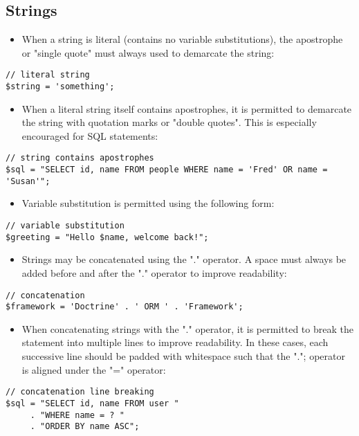 \documentclass[11pt,a4paper]{report}
\begin{document}
\subsection{Strings}
\begin{itemize}
\item{When a string is literal (contains no variable substitutions), the apostrophe or "single quote" must always used to demarcate the string:}
\end{itemize}
\begin{verbatim}
// literal string
$string = 'something';
\end{verbatim}

\begin{itemize}
\item{When a literal string itself contains apostrophes, it is permitted to demarcate the string with quotation marks or "double quotes". This is especially encouraged for SQL statements:}
\end{itemize}
\begin{verbatim}
// string contains apostrophes
$sql = "SELECT id, name FROM people WHERE name = 'Fred' OR name = 'Susan'";
\end{verbatim}

\begin{itemize}
\item{Variable substitution is permitted using the following form:}
\end{itemize}
\begin{verbatim}
// variable substitution
$greeting = "Hello $name, welcome back!";
\end{verbatim}

\begin{itemize}
\item{Strings may be concatenated using the "." operator. A space must always be added before and after the "." operator to improve readability:}
\end{itemize}
\begin{verbatim}
// concatenation
$framework = 'Doctrine' . ' ORM ' . 'Framework';
\end{verbatim}

\begin{itemize}
\item{When concatenating strings with the "." operator, it is permitted to break the statement into multiple lines to improve readability. In these cases, each successive line should be padded with whitespace such that the "."; operator is aligned under the "=" operator:}
\end{itemize}
\begin{verbatim}
// concatenation line breaking
$sql = "SELECT id, name FROM user "
     . "WHERE name = ? "
     . "ORDER BY name ASC";
\end{verbatim}
\end{document}
